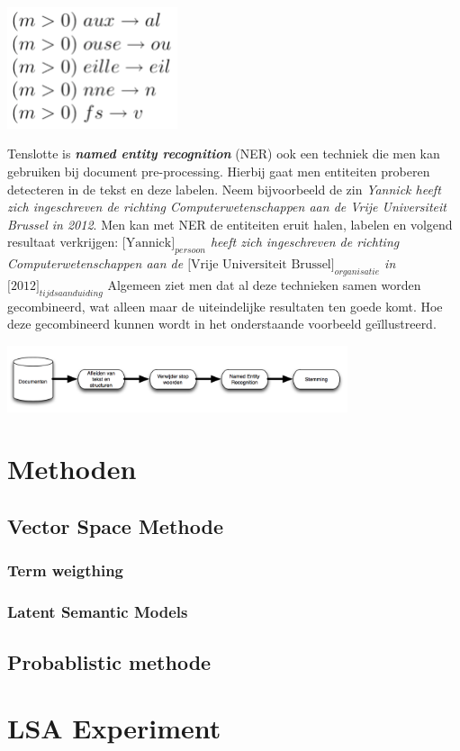 \newline
\begin{center}
  \includegraphics[width=5cm]{stemming_regels_frans}
\end{center}
Tenslotte is \textbf{\textit{named entity recognition}} (NER) ook een techniek die men kan gebruiken bij document pre-processing. Hierbij gaat men entiteiten proberen detecteren in de tekst en deze labelen. Neem bijvoorbeeld de zin \textit{Yannick heeft zich ingeschreven de richting Computerwetenschappen aan de Vrije Universiteit Brussel in 2012}. Men kan met NER de entiteiten eruit halen, labelen en volgend resultaat verkrijgen: \textit{$\text{[Yannick]}_{persoon}$ heeft zich ingeschreven de richting Computerwetenschappen aan de $\text{[Vrije Universiteit Brussel]}_{organisatie}$ in $\text{[2012]}_{tijdsaanduiding}$}
\newline
Algemeen ziet men dat al deze technieken samen worden gecombineerd, wat alleen maar de uiteindelijke resultaten ten goede komt. Hoe deze gecombineerd kunnen wordt in het onderstaande voorbeeld ge\"illustreerd. 
\newline
\begin{center}
  \includegraphics[width=10cm]{document_preprocessing}
\end{center}

\section{Methoden}\label{Methoden}

\subsection{Vector Space Methode}\label{Vector Space Methode}


\subsubsection{Term weigthing}\label{Term weighting}

\subsubsection{Latent Semantic Models}\label{Latent Semantic Models}


\subsection{Probablistic methode}\label{Probablistic methode}

\section{LSA Experiment}\label{LSA Experiment}
